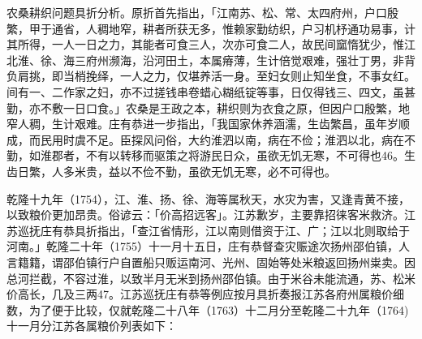\noindent 农桑耕织问题具折分析。原折首先指出，「江南苏、松、常、太四府州，户口殷繁，甲于通省，人稠地窄，耕者所获无多，惟赖家勤纺织，户习机杼通功易事，计其所得，一人一日之力，其能者可食三人，次亦可食二人，故民间窳惰犹少，惟江北淮、徐、海三府州濒海，沿河田土，本属瘠薄，生计倍觉艰难，强壮丁男，非背负肩挑，即当梢挽绎，一人之力，仅堪养活一身。至妇女则止知坐食，不事女红。间有一、二作家之妇，亦不过搓钱串卷蜡心糊纸锭等事，日仅得钱三、四文，虽甚勤，亦不敷一日口食。」农桑是王政之本，耕织则为衣食之原，但因户口殷繁，地窄人稠，生计艰难。庄有恭进一步指出，「我国家休养涵濡，生齿繁昌，虽年岁顺成，而民用时虞不足。臣探风问俗，大约淮泗以南，病在不俭；淮泗以北，病在不勤，如淮郡者，不有以转移而驱策之将游民日众，虽欲无饥无寒，不可得也46。生齿日繁，人多米贵，益以不俭不勤，虽欲无饥无寒，必不可得也。

乾隆十九年（1754），江、淮、扬、徐、海等属秋天，水灾为害，又逢青黄不接，以致粮价更加昂贵。俗谚云：「价高招远客」。江苏歉岁，主要靠招徕客米救济。江苏巡抚庄有恭具折指出，「查江省情形，江以南则借资于江、广；江以北则取给于河南。」乾隆二十年（1755）十一月十五日，庄有恭督查灾赈途次扬州邵伯镇，人言籍籍，谓邵伯镇行户自置船只贩运南河、光州、固始等处米粮返回扬州粜卖。因总河拦截，不容过淮，以致半月无米到扬州邵伯镇。由于米谷未能流通，苏、松米价高长，几及三两47。江苏巡抚庄有恭等例应按月具折奏报江苏各府州属粮价细数，为了便于比较，仅就乾隆二十八年（1763）十二月分至乾隆二十九年（1764)十一月分江苏各属粮价列表如下：

\vfill
\begin{BookNotes}
\end{BookNotes}




